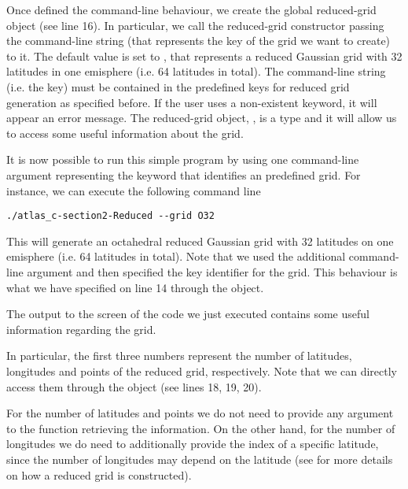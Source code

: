 %

%
Once defined the command-line behaviour, we create the global 
reduced-grid object (see line 16). In particular, we call the 
reduced-grid constructor passing the command-line string (that 
represents the key of the grid we want to create) to it.
The default value is set to , that represents 
a reduced Gaussian grid with 32 latitudes in one emisphere 
(i.e. 64 latitudes in total).  
The command-line string (i.e. the key) must be contained 
in the predefined keys for reduced grid generation as specified 
before. If the user uses a non-existent keyword, it will 
appear an error message.
The reduced-grid object, , is 
a  type and it will allow 
us to access some useful information about the grid.  

It is now possible to run this simple program by using one 
command-line argument representing the keyword that identifies 
an \Atlas predefined grid. For instance, we can execute the 
following command line
%
\begin{lstlisting}[style=BashStyle]
./atlas_c-section2-Reduced --grid O32
\end{lstlisting}
% 
This will generate an octahedral reduced Gaussian grid with 
32 latitudes on one emisphere (i.e. 64 latitudes in total).
Note that we used the additional command-line argument 
 and then specified the key identifier 
for the grid. This behaviour is what we have specified 
on line 14 through the  object.

The output to the screen of the code we just executed 
contains some useful information regarding the grid. 

In particular, the first three numbers represent the 
number of latitudes, longitudes and points of the reduced
grid, respectively. Note that we can directly access them 
through the  object (see lines 18, 19, 20).
\begin{tipbox}
For the number of latitudes and points we do not need to provide
any argument to the function retrieving the information. On the 
other hand, for the number of longitudes we do need to additionally 
provide the index of a specific latitude, since the number of 
longitudes may depend on the latitude (see  
for more details on how a reduced grid is constructed). 
\end{tipbox}

